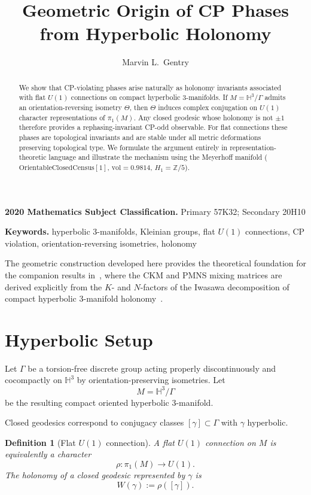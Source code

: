 \documentclass[12pt]{article}
\title{Geometric Origin of CP Phases from Hyperbolic Holonomy}
\author[1]{Marvin L.\ Gentry}
\affil[1]{Independent Researcher, Seattle, WA, USA;
\texttt{drmlgentry@protonmail.com};
ORCID: 0009-0006-4550-2663}
\date{}
\newtheorem{definition}[theorem]{Definition}
\theoremstyle{remark}
\theoremstyle{plain}
\newcommand{\subjclass}[2][2020]{\par\noindent\textbf{#1 Mathematics Subject Classification.} #2\par}
\newcommand{\keywords}[1]{\par\noindent\textbf{Keywords.} #1\par}
\begin{document}
\maketitle

\begin{abstract}
We show that CP-violating phases arise naturally as holonomy invariants
associated with flat $U(1)$ connections on compact hyperbolic $3$-manifolds.
If $M = \mathbb{H}^3/\Gamma$ admits an orientation-reversing isometry $\Theta$,
then $\Theta$ induces complex conjugation on $U(1)$ character representations
of $\pi_1(M)$. Any closed geodesic whose holonomy is not $\pm 1$
therefore provides a rephasing-invariant CP-odd observable.
For flat connections these phases are topological invariants and
are stable under all metric deformations preserving topological type.
We formulate the argument entirely in representation-theoretic language
and illustrate the mechanism using the Meyerhoff manifold ($\mathrm{OrientableClosedCensus}[1]$, $\mathrm{vol}=0.9814$, $H_1=\mathbb{Z}/5$).
\end{abstract}

\subjclass[2020]{Primary 57K32; Secondary 20H10}

\keywords{hyperbolic 3-manifolds, Kleinian groups, flat $U(1)$ connections,
CP violation, orientation-reversing isometries, holonomy}

The geometric construction developed here provides the theoretical
foundation for the companion results in~\cite{Gentry:CKM,Gentry:PMNS},
where the CKM and PMNS mixing matrices are derived explicitly from the
$K$- and $N$-factors of the Iwasawa decomposition of compact hyperbolic
3-manifold holonomy~\cite{Gentry:CKM,Gentry:PMNS}.

\section{Hyperbolic Setup}

Let $\Gamma$ be a torsion-free discrete group acting properly discontinuously
and cocompactly on $\mathbb{H}^3$ by orientation-preserving isometries.
Let
\[
M = \mathbb{H}^3/\Gamma
\]
be the resulting compact oriented hyperbolic $3$-manifold.

Closed geodesics correspond to conjugacy classes
$[\gamma] \subset \Gamma$ with $\gamma$ hyperbolic.

\begin{definition}[Flat $U(1)$ connection]
A flat $U(1)$ connection on $M$ is equivalently a character
\[
\rho : \pi_1(M) \longrightarrow U(1).
\]
The holonomy of a closed geodesic represented by $\gamma$
is
\[
W(\gamma) := \rho([\gamma]).
\]
\end{definition}
\end{document}
